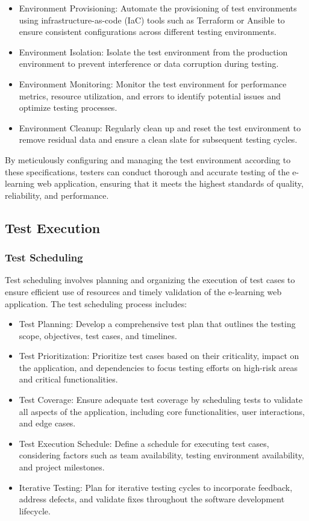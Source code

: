 		\begin{itemize}
			\item Environment Provisioning: Automate the provisioning of test environments using infrastructure-as-code (IaC) tools such as Terraform or Ansible to ensure consistent configurations across different testing environments.
			\item Environment Isolation: Isolate the test environment from the production environment to prevent interference or data corruption during testing.
			\item Environment Monitoring: Monitor the test environment for performance metrics, resource utilization, and errors to identify potential issues and optimize testing processes.
			\item Environment Cleanup: Regularly clean up and reset the test environment to remove residual data and ensure a clean slate for subsequent testing cycles.
		\end{itemize}
		
		By meticulously configuring and managing the test environment according to these specifications, testers can conduct thorough and accurate testing of the e-learning web application, ensuring that it meets the highest standards of quality, reliability, and performance.
		
	\subsection{Test Execution}
	
		\subsubsection{Test Scheduling}
		
		Test scheduling involves planning and organizing the execution of test cases to ensure efficient use of resources and timely validation of the e-learning web application. The test scheduling process includes:
		
		\begin{itemize}
			\item Test Planning: Develop a comprehensive test plan that outlines the testing scope, objectives, test cases, and timelines.
			\item Test Prioritization: Prioritize test cases based on their criticality, impact on the application, and dependencies to focus testing efforts on high-risk areas and critical functionalities.
			\item Test Coverage: Ensure adequate test coverage by scheduling tests to validate all aspects of the application, including core functionalities, user interactions, and edge cases.
			\item Test Execution Schedule: Define a schedule for executing test cases, considering factors such as team availability, testing environment availability, and project milestones.
			\item Iterative Testing: Plan for iterative testing cycles to incorporate feedback, address defects, and validate fixes throughout the software development lifecycle.
		\end{itemize}
		
